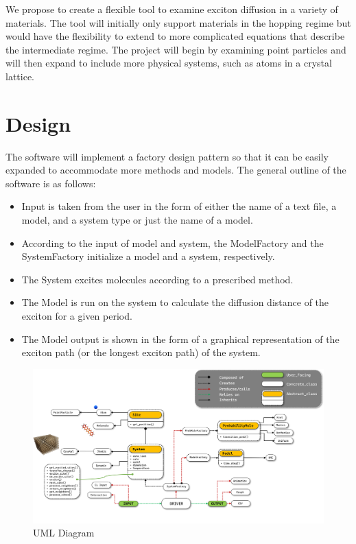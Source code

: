 \documentclass{article}
\begin{document}
We propose to create a flexible tool to examine exciton diffusion in a variety of materials. The tool will initially only support materials in the hopping regime but would have the flexibility to extend to more complicated equations that describe the intermediate regime. The project will begin by examining point particles and will then expand to include more physical systems, such as atoms in a crystal lattice.

\section{Design}

The software will implement a factory design pattern so that it can be easily expanded to accommodate more methods and models. The general outline of the software is as follows:

\begin{itemize}
    \item Input is taken from the user in the form of either the name of a text file, a model, and a system type or just the name of a model.
    \item According to the input of model and system, the ModelFactory and the SystemFactory initialize a model and a system, respectively.
    \item The System excites molecules according to a prescribed method.
    \item The Model is run on the system to calculate the diffusion distance of the exciton for a given period.
    \item The Model output is shown in the form of a graphical representation of the exciton path (or the longest exciton path) of the system.
\end{itemize}

\begin{figure}
    \centering
   \includegraphics[scale=0.4]{UML_2.png}
    \caption{UML Diagram}
    \label{fig:my_label}
\end{figure}
\end{document}
